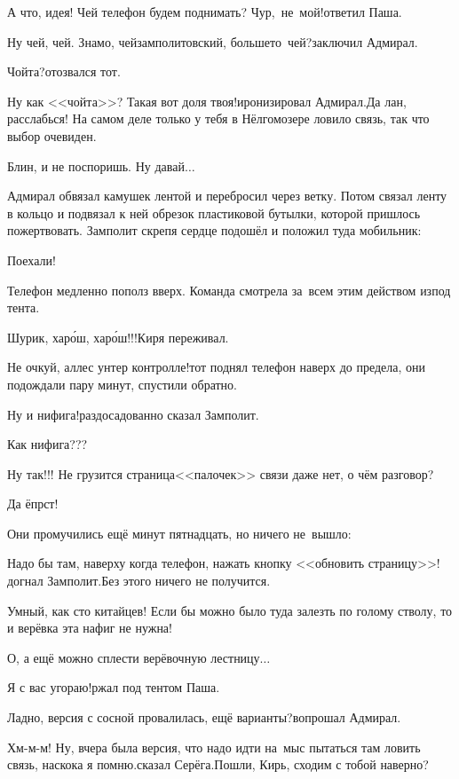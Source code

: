 \diagdash А что, идея! Чей телефон будем поднимать? Чур,~не~мой!\mdash ответил Паша.

\diagdash Ну чей, чей. Знамо, чей\mdash замполитовский, больше\sdash то~чей?\mdash заключил Адмирал.

\diagdash Чойта?\mdash отозвался тот.

\diagdash Ну как <<чойта>>? Такая вот доля твоя!\mdash иронизировал Адмирал.\mdash Да лан, расслабься! На самом деле только у тебя в Нёлгомозере ловило связь, так что выбор очевиден.

\diagdash Блин, и не поспоришь. Ну давай$\ldots$

Адмирал обвязал камушек лентой и перебросил через ветку. Потом связал ленту в кольцо и подвязал к ней обрезок пластиковой бутылки, которой пришлось пожертвовать. Замполит скрепя сердце подошёл и положил туда мобильник:

\diagdash Поехали!

Телефон медленно пополз вверх. Команда смотрела за~всем этим действом из\sdash под тента.

\diagdash Шурик, хар{\'о}ш, хар{\'о}ш!!!\mdash Киря переживал.

\diagdash Не очкуй, аллес унтер контролле!\mdash тот поднял телефон наверх до предела, они подождали пару минут, спустили обратно.

\diagdash Ну и нифига!\mdash раздосадованно сказал Замполит.

\diagdash Как нифига???

\diagdash Ну так!!! Не грузится страница\mdash <<палочек>> связи даже нет, о чём разговор?

\diagdash Да ёпрст!

Они промучились ещё минут пятнадцать, но ничего не~вышло:

\diagdash Надо бы там, наверху когда телефон, нажать кнопку <<обновить страницу>>!\mdash догнал Замполит.\mdash Без этого ничего не получится.

\diagdash Умный, как сто китайцев! Если бы можно было туда залезть по голому стволу, то и верёвка эта нафиг не нужна!

\diagdash О, а ещё можно сплести верёвочную лестницу$\ldots$

\diagdash Я с вас угораю!\mdash ржал под тентом Паша.

\diagdash Ладно, версия с сосной провалилась, ещё варианты?\mdash вопрошал Адмирал.

\diagdash Хм-м-м! Ну, вчера была версия, что надо идти на~мыс пытаться там ловить связь, наскока я помню.\mdash сказал Серёга.\mdash Пошли, Кирь, сходим с тобой наверно?

